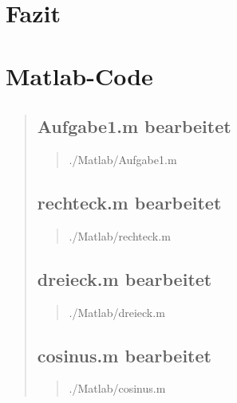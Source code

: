 \section{Fazit}
\begin{quote}
     
\end{quote}

\section{Matlab-Code}
\begin{quote}
    \subsection{Aufgabe1.m bearbeitet}
    \begin{quote}
            
            {./Matlab/Aufgabe1.m}
    \end{quote}
    \subsection{rechteck.m bearbeitet}
    \begin{quote}
            
            {./Matlab/rechteck.m}
    \end{quote}
    \subsection{dreieck.m bearbeitet}
    \begin{quote}
            
            {./Matlab/dreieck.m}        
    \end{quote}
    \subsection{cosinus.m bearbeitet}
    \begin{quote}
            
            {./Matlab/cosinus.m}        
    \end{quote}                 	
\end{quote}



